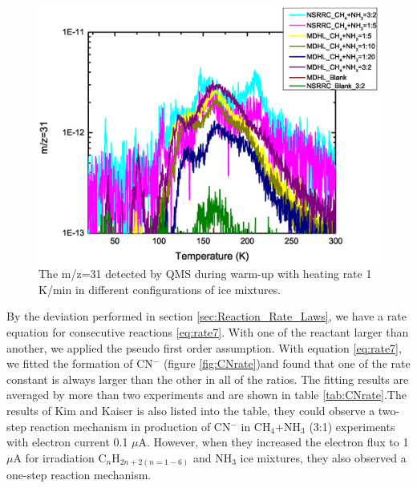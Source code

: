 \begin{figure}
\centering
\includegraphics[width=\textwidth]{figures/chapter3/Mass31.eps}
\caption{The m/z=31 detected by QMS during warm-up with heating rate 1 K/min in different configurations of ice mixtures.}
\label{fig:CNmechanism}
\end{figure}

By the deviation performed in section \ref{sec:Reaction_Rate_Laws}, we have a rate equation for consecutive reactions \ref{eq:rate7}. With one of the reactant larger than another, we applied the pseudo first order assumption. With equation \ref{eq:rate7}, we fitted the formation of CN$^-$ (figure \ref{fig:CNrate})and found that one of the rate constant is always larger than the other in all of the ratios. The fitting results are averaged by more than two experiments and are shown in table \ref{tab:CNrate}.The results of Kim and Kaiser is also listed into the table, they could observe a two-step reaction mechanism in production of CN$^-$ in CH$_4$+NH$_3$ (3:1) experiments with electron current 0.1 $\mu$A. However, when they increased the electron flux to 1 $\mu$A for irradiation C$_n$H$_{2n+2 (n=1-6)}$ and NH$_3$ ice mixtures, they also observed a one-step reaction mechanism.

